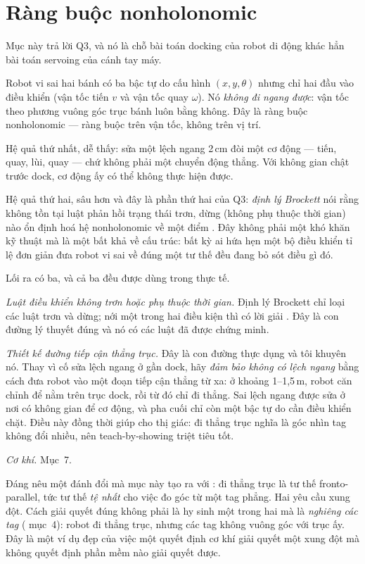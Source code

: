 \documentclass[../../marker.tex]{subfiles}
\begin{document}
\section{Ràng buộc nonholonomic}

Mục này trả lời Q3, và nó là chỗ bài toán docking của robot di động khác hẳn bài toán servoing của cánh tay máy.

Robot vi sai hai bánh có ba bậc tự do cấu hình \((x, y, \theta)\) nhưng chỉ hai đầu vào điều khiển (vận tốc tiến \(v\) và vận tốc quay \(\omega\)). Nó \emph{không đi ngang được}: vận tốc theo phương vuông góc trục bánh luôn bằng không. Đây là ràng buộc nonholonomic --- ràng buộc trên vận tốc, không trên vị trí.

Hệ quả thứ nhất, dễ thấy: sửa một lệch ngang 2\,cm đòi một cơ động --- tiến, quay, lùi, quay --- chứ không phải một chuyển động thẳng. Với không gian chật trước dock, cơ động ấy có thể không thực hiện được.

Hệ quả thứ hai, sâu hơn và đây là phần thứ hai của Q3: \emph{định lý Brockett} nói rằng không tồn tại luật phản hồi trạng thái trơn, dừng (không phụ thuộc thời gian) nào ổn định hoá hệ nonholonomic về một điểm \cite{brockett1983asymptotic}. Đây không phải một khó khăn kỹ thuật mà là một bất khả về cấu trúc: bất kỳ ai hứa hẹn một bộ điều khiển tỉ lệ đơn giản đưa robot vi sai về đúng một tư thế đều đang bỏ sót điều gì đó.

Lối ra có ba, và cả ba đều được dùng trong thực tế.

\emph{Luật điều khiển không trơn hoặc phụ thuộc thời gian.} Định lý Brockett chỉ loại các luật trơn và dừng; nới một trong hai điều kiện thì có lời giải \cite{samson1995control}. Đây là con đường lý thuyết đúng và nó có các luật đã được chứng minh.

\emph{Thiết kế đường tiếp cận thẳng trục.} Đây là con đường thực dụng và tôi khuyên nó. Thay vì cố sửa lệch ngang ở gần dock, hãy \emph{đảm bảo không có lệch ngang} bằng cách đưa robot vào một đoạn tiếp cận thẳng từ xa: ở khoảng 1--1,5\,m, robot căn chỉnh để nằm trên trục dock, rồi từ đó chỉ đi thẳng. Sai lệch ngang được sửa ở nơi có không gian để cơ động, và pha cuối chỉ còn một bậc tự do cần điều khiển chặt. Điều này đồng thời giúp cho thị giác: đi thẳng trục nghĩa là góc nhìn tag không đổi nhiều, nên teach-by-showing triệt tiêu tốt.

\emph{Cơ khí.} Mục~7.

Đáng nêu một đánh đổi mà mục này tạo ra với : đi thẳng trục là tư thế fronto-parallel, tức tư thế \emph{tệ nhất} cho việc đo góc từ một tag phẳng. Hai yêu cầu xung đột. Cách giải quyết đúng không phải là hy sinh một trong hai mà là \emph{nghiêng các tag} ( mục~4): robot đi thẳng trục, nhưng các tag không vuông góc với trục ấy. Đây là một ví dụ đẹp của việc một quyết định cơ khí giải quyết một xung đột mà không quyết định phần mềm nào giải quyết được.
\end{document}
